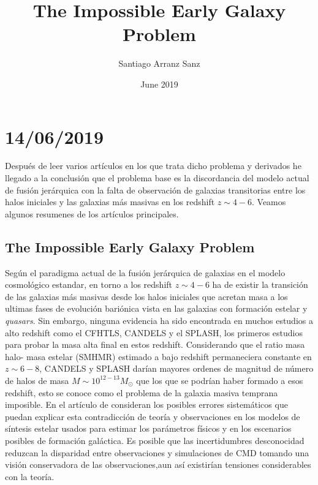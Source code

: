 \documentclass{article}
\title{The Impossible  Early Galaxy Problem}
\author{Santiago Arranz Sanz }
\date{June 2019}
\begin{document}
\maketitle

\section*{14/06/2019}

Después de leer varios artículos en los que trata dicho problema y derivados he llegado a la conclusión que el problema base es la discordancia del modelo actual de fusión jerárquica con la falta de observación de galaxias transitorias entre los halos iniciales y las galaxias más masivas en los redshift $z\sim 4-6$. Veamos algunos resumenes de los artículos principales.

\subsection*{The Impossible Early Galaxy Problem}
\citep{steinhardt2016impossibly} Según el paradigma actual de la fusión jerárquica de galaxias en el modelo cosmológico estandar, en torno a los redshift $z\sim 4-6$ ha de existir la transición de las galaxias más masivas desde los halos iniciales que acretan masa a los ultimas fases de evolución bariónica vista en las galaxias con formación estelar y \textit{quasars}. Sin embargo, ninguna evidencia ha sido encontrada en muchos estudios a alto redshift como el CFHTLS, CANDELS y el SPLASH, los primeros estudios para probar la masa alta final en estos redshift. Considerando que el ratio masa halo- masa estelar (SMHMR) estimado a bajo redshift permaneciera constante en $z\sim 6-8$, CANDELS y SPLASH darían mayores ordenes de magnitud de número de halos de masa $M\sim 10^{12-13}M_\odot$ que los que se podrían haber formado a esos redshift, esto se conoce como el problema de la galaxia masiva temprana imposible. En el artículo de \cite{steinhardt2016impossibly} consideran los posibles errores sistemáticos que puedan explicar esta contradicción de teoría y observaciones en los modelos de síntesis estelar usados para estimar los parámetros físicos  y en los escenarios posibles de formación galáctica. Es posible que las incertidumbres desconocidad reduzcan la disparidad entre observaciones y simulaciones de CMD tomando una visión conservadora de las observaciones,aun así existirían tensiones considerables con la teoría.\\
\end{document}
